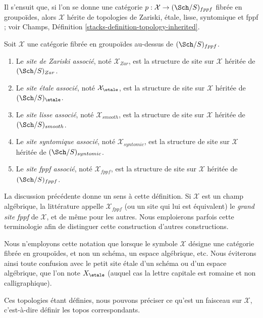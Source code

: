 \medskip\noindent
Il s'ensuit que, si l'on se donne une catégorie
$p : \mathcal{X} \to (\Sch/S)_{fppf}$ fibrée en groupoïdes, alors
$\mathcal{X}$ hérite de topologies de Zariski, étale, lisse, syntomique et
fppf ; voir
Champs, Définition \ref{stacks-definition-topology-inherited}.

\begin{definition}
\label{definition-inherited-topologies}
Soit $\mathcal{X}$ une catégorie fibrée en groupoïdes au-dessus de
$(\Sch/S)_{fppf}$.
\begin{enumerate}
\item Le {\it site de Zariski associé}, noté $\mathcal{X}_{Zar}$,
est la structure de site sur $\mathcal{X}$ héritée de
$(\Sch/S)_{Zar}$.
\item Le {\it site étale associé}, noté $\mathcal{X}_\etale$,
est la structure de site sur $\mathcal{X}$ héritée de
$(\Sch/S)_\etale$.
\item Le {\it site lisse associé}, noté $\mathcal{X}_{smooth}$,
est la structure de site sur $\mathcal{X}$ héritée de
$(\Sch/S)_{smooth}$.
\item Le {\it site syntomique associé}, noté $\mathcal{X}_{syntomic}$,
est la structure de site sur $\mathcal{X}$ héritée de
$(\Sch/S)_{syntomic}$.
\item Le {\it site fppf associé}, noté $\mathcal{X}_{fppf}$,
est la structure de site sur $\mathcal{X}$ héritée de
$(\Sch/S)_{fppf}$.
\end{enumerate}
\end{definition}

\noindent
La discussion précédente donne un sens à cette définition. Si $\mathcal{X}$
est un champ algébrique, la littérature appelle $\mathcal{X}_{fppf}$ (ou un
site qui lui est équivalent) le {\it grand site fppf} de $\mathcal{X}$, et de même
pour les autres. Nous emploierons parfois cette terminologie afin de
distinguer cette construction d'autres constructions.

\begin{remark}
\label{remark-ambiguity}
Nous n'employons cette notation que lorsque le symbole $\mathcal{X}$ désigne une
catégorie fibrée en groupoïdes, et non un schéma, un espace algébrique, etc.
Nous éviterons ainsi toute confusion avec le petit site étale d'un
schéma ou d'un espace algébrique, que l'on note $X_\etale$ (auquel cas
la lettre capitale est romaine et non calligraphique).
\end{remark}

\noindent
Ces topologies étant définies, nous pouvons préciser ce qu'est
un faisceau sur $\mathcal{X}$, c'est-à-dire définir les topos correspondants.

